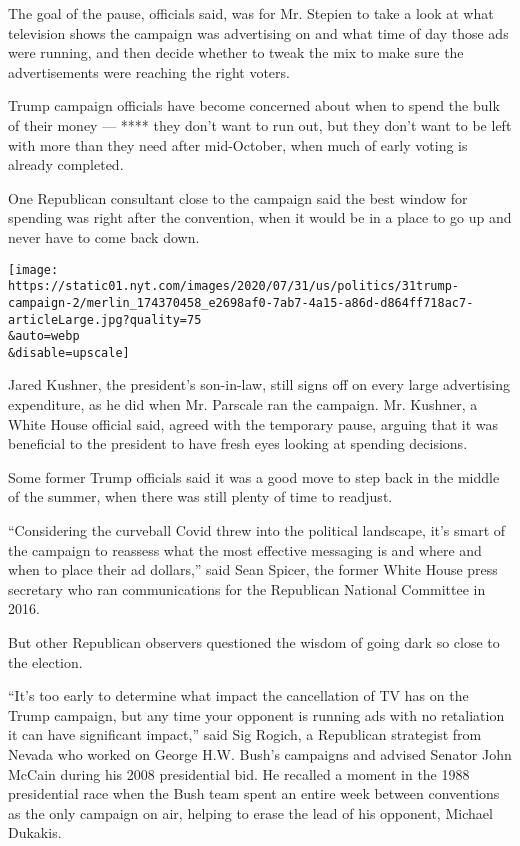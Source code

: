 The goal of the pause, officials said, was for Mr. Stepien to take a
look at what television shows the campaign was advertising on and what
time of day those ads were running, and then decide whether to tweak the
mix to make sure the advertisements were reaching the right voters.

Trump campaign officials have become concerned about when to spend the
bulk of their money --- **** they don't want to run out, but they don't
want to be left with more than they need after mid-October, when much of
early voting is already completed.

One Republican consultant close to the campaign said the best window for
spending was right after the convention, when it would be in a place to
go up and never have to come back down.

\texttt{[image: https://static01.nyt.com/images/2020/07/31/us/politics/31trump-campaign-2/merlin\_174370458\_e2698af0-7ab7-4a15-a86d-d864ff718ac7-articleLarge.jpg?quality=75\\\&auto=webp\\\&disable=upscale]}

Jared Kushner, the president's son-in-law, still signs off on every
large advertising expenditure, as he did when Mr. Parscale ran the
campaign. Mr. Kushner, a White House official said, agreed with the
temporary pause, arguing that it was beneficial to the president to have
fresh eyes looking at spending decisions.

Some former Trump officials said it was a good move to step back in the
middle of the summer, when there was still plenty of time to readjust.

``Considering the curveball Covid threw into the political landscape,
it's smart of the campaign to reassess what the most effective messaging
is and where and when to place their ad dollars,'' said Sean Spicer, the
former White House press secretary who ran communications for the
Republican National Committee in 2016.

But other Republican observers questioned the wisdom of going dark so
close to the election.

``It's too early to determine what impact the cancellation of TV has on
the Trump campaign, but any time your opponent is running ads with no
retaliation it can have significant impact,'' said Sig Rogich, a
Republican strategist from Nevada who worked on George H.W. Bush's
campaigns and advised Senator John McCain during his 2008 presidential
bid. He recalled a moment in the 1988 presidential race when the Bush
team spent an entire week between conventions as the only campaign on
air, helping to erase the lead of his opponent, Michael Dukakis.

